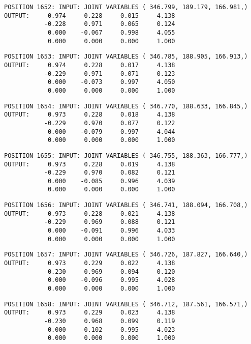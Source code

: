 \begin{verbatim}
POSITION 1652: INPUT: JOINT VARIABLES ( 346.799, 189.179, 166.981,)
OUTPUT:     0.974     0.228     0.015     4.138
           -0.228     0.971     0.065     0.124
            0.000    -0.067     0.998     4.055
            0.000     0.000     0.000     1.000
\end{verbatim} \pagebreak[1]\begin{verbatim}
POSITION 1653: INPUT: JOINT VARIABLES ( 346.785, 188.905, 166.913,)
OUTPUT:     0.974     0.228     0.017     4.138
           -0.229     0.971     0.071     0.123
            0.000    -0.073     0.997     4.050
            0.000     0.000     0.000     1.000
\end{verbatim} \pagebreak[1]\begin{verbatim}
POSITION 1654: INPUT: JOINT VARIABLES ( 346.770, 188.633, 166.845,)
OUTPUT:     0.973     0.228     0.018     4.138
           -0.229     0.970     0.077     0.122
            0.000    -0.079     0.997     4.044
            0.000     0.000     0.000     1.000
\end{verbatim} \pagebreak[1]\begin{verbatim}
POSITION 1655: INPUT: JOINT VARIABLES ( 346.755, 188.363, 166.777,)
OUTPUT:     0.973     0.228     0.019     4.138
           -0.229     0.970     0.082     0.121
            0.000    -0.085     0.996     4.039
            0.000     0.000     0.000     1.000
\end{verbatim} \pagebreak[1]\begin{verbatim}
POSITION 1656: INPUT: JOINT VARIABLES ( 346.741, 188.094, 166.708,)
OUTPUT:     0.973     0.228     0.021     4.138
           -0.229     0.969     0.088     0.121
            0.000    -0.091     0.996     4.033
            0.000     0.000     0.000     1.000
\end{verbatim} \pagebreak[1]\begin{verbatim}
POSITION 1657: INPUT: JOINT VARIABLES ( 346.726, 187.827, 166.640,)
OUTPUT:     0.973     0.229     0.022     4.138
           -0.230     0.969     0.094     0.120
            0.000    -0.096     0.995     4.028
            0.000     0.000     0.000     1.000
\end{verbatim} \pagebreak[1]\begin{verbatim}
POSITION 1658: INPUT: JOINT VARIABLES ( 346.712, 187.561, 166.571,)
OUTPUT:     0.973     0.229     0.023     4.138
           -0.230     0.968     0.099     0.119
            0.000    -0.102     0.995     4.023
            0.000     0.000     0.000     1.000
\end{verbatim} \pagebreak[1]\begin{verbatim}

\end{verbatim}
